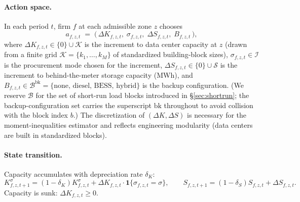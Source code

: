 \documentclass[12pt,letterpaper]{article}
\begin{document}
\paragraph{Action space.} In each period $t$, firm $f$ at each admissible
zone $z$ chooses
\begin{equation}
\label{eq:hyper_action}
a_{f,z,t} \;=\; \big(\,
\Delta K_{f,z,t},\; \sigma_{f,z,t},\; \Delta S_{f,z,t},\; B_{f,z,t}\,
\big),
\end{equation}
where $\Delta K_{f,z,t} \in \{0\} \cup \mathcal{K}$ is the increment to
data center capacity at $z$ (drawn from a finite grid $\mathcal{K} =
\{k_1, \dots, k_M\}$ of standardized building-block sizes),
$\sigma_{f,z,t} \in \mathcal{I}$ is the procurement mode chosen for the
increment, $\Delta S_{f,z,t} \in \{0\} \cup \mathcal{S}$ is the increment
to behind-the-meter storage capacity (MWh), and $B_{f,z,t} \in \mathcal{B}^{\mathrm{bk}} =
\{\text{none, diesel, BESS, hybrid}\}$ is the backup configuration. (We reserve
$\mathcal{B}$ for the set of short-run load blocks introduced in
\S\ref{sec:shortrun}; the backup-configuration set carries the superscript
$\mathrm{bk}$ throughout to avoid collision with the block index $b$.) The
discretization of $(\Delta K, \Delta S)$ is necessary for the moment-inequalities
estimator and reflects engineering modularity (data centers are built in
standardized blocks).

\paragraph{State transition.} Capacity accumulates with depreciation rate
$\delta_K$:
\begin{equation}
\label{eq:state_transition}
K_{f,z,t+1}^\sigma = (1 - \delta_K) K_{f,z,t}^\sigma + \Delta K_{f,z,t}
\cdot \mathbf{1}\{\sigma_{f,z,t} = \sigma\}, \qquad
S_{f,z,t+1} = (1 - \delta_S) S_{f,z,t} + \Delta S_{f,z,t}.
\end{equation}
Capacity is sunk: $\Delta K_{f,z,t} \geq 0$.
\end{document}
